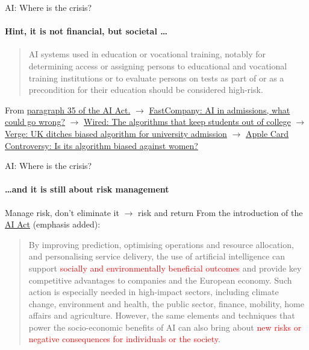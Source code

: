 \begin{frame}{AI: Where is the crisis?}
  \framesubtitle{Hint, it is not financial, but societal \ldots}
  \begin{quotation}
    AI systems used in education or vocational training, notably for determining access or assigning persons to educational and vocational training institutions or to evaluate persons on tests as part of or as a precondition for their education should be considered high-risk.
  \end{quotation}
  From \href{https://eur-lex.europa.eu/resource.html?uri=cellar:e0649735-a372-11eb-9585-01aa75ed71a1.0001.02/DOC_1&format=PDF}{paragraph 35 of the AI Act.}
  \newline
  \newline
  $\rightarrow$ \href{https://www.fastcompany.com/90342596/schools-are-quietly-turning-to-ai-to-help-pick-who-gets-in-what-could-go-wrong}{FastCompany: AI in admissions, what could go wrong?}
  \newline
  $\rightarrow$ \href{https://www.wired.com/story/algorithm-set-students-grades-altered-futures/}{Wired: The algorithms that keep students out of college}
  \newline
  $\rightarrow$ \href{https://www.theverge.com/2020/8/17/21372045/uk-a-level-results-algorithm-biased-coronavirus-covid-19-pandemic-university-applications}{Verge: UK ditches biased algorithm for university admission}
  $\rightarrow$ \href{https://qz.com/1748321/the-role-of-goldman-sachs-algorithms-in-the-apple-credit-card-scandal/}{Apple Card Controversy: Is its algorithm biased against women?}

\end{frame}

\begin{frame}{AI: Where is the crisis?}
  \framesubtitle{\ldots and it is still about risk management}
  {\large Manage risk, don't eliminate it $\rightarrow$ risk and return}
  \newline
  \newline
  From the introduction of the \href{https://eur-lex.europa.eu/resource.html?uri=cellar:e0649735-a372-11eb-9585-01aa75ed71a1.0001.02/DOC_1&format=PDF}{AI Act} (emphasis added):
  \begin{quotation}
    By improving prediction, optimising operations and resource allocation, and personalising service delivery, the use of artificial intelligence can support \textcolor{red}{socially and environmentally beneficial outcomes} and provide key competitive advantages to companies and the European economy. Such action is especially needed in high-impact sectors, including climate change, environment and health, the public sector, finance, mobility, home affairs and agriculture. However, the same elements and techniques that power the socio-economic benefits of AI can also bring about \textcolor{red}{new risks or negative consequences for individuals or the society}.
  \end{quotation}

\end{frame}

